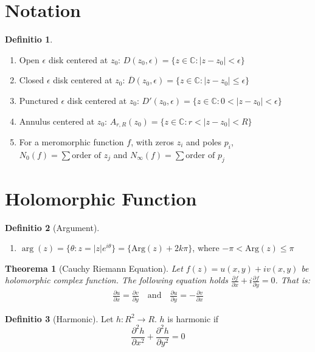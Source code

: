 \documentclass[12pt, a4paper]{article}
\newtheorem{theorem}{Theorema}[section]
\theoremstyle{definition}
\newtheorem{definition}{Definitio}[section]
\theoremstyle{remark}
\newcommand{\bb}[1]{\mathbb{#1}}
\newcommand{\Arg}{\text{Arg}}
\begin{document}
\section{Notation} 
\begin{definition}
	\ 
	\begin{enumerate}
		\item Open $\epsilon$ disk centered at $z_0$: $D(z_0, \epsilon) = \{z \in \bb{C} : |z - z_0| < \epsilon\}$
		\item Closed $\epsilon$ disk centered at $z_0$: $\overline{D}(z_0, \epsilon) = \{z \in \bb{C} : |z - z_0| \leq \epsilon\}$	
		\item Punctured $\epsilon$ disk centered at $z_0$: $D'(z_0, \epsilon) = \{z \in \bb{C} : 0 < |z - z_0| < \epsilon\}$
		\item Annulus centered at $z_0$: $A_{r, R}(z_0) = \{z \in \bb{C} : r < |z - z_0| < R\}$
    \item For a meromorphic function $f$, with zeros $z_i$ and poles $p_i$, $N_0(f) = \sum \text{order of } z_j$ and $N_{\infty} (f) = \sum \text{order of } p_j$
	\end{enumerate}

\end{definition}

\section{Holomorphic Function}

\begin{definition}[Argument]
	\ 
	\begin{enumerate}
		\item $\arg (z) = \{\theta : z = |z| e^{i \theta}\} = \{\Arg(z) + 2k\pi\}$, where $- \pi <\Arg(z) \leq \pi$
	\end{enumerate}
\end{definition}

\begin{theorem}[Cauchy Riemann Equation]
	Let $f(z) = u(x, y) + iv(x, y)$ be holomorphic 
	complex function. The following equation holds $\frac{\partial f}{\partial x} + i\frac{\partial f}{\partial y} =0 $. That is:
	\begin{align*}
		\frac{\partial u}{\partial x} = \frac{\partial v}{\partial y} \quad \text{and} \quad \frac{\partial u}{\partial y} = -\frac{\partial v}{\partial x}
	\end{align*}
\end{theorem}

\begin{definition}[Harmonic]
	Let $h: R^2 \rightarrow  R$. $h$ is harmonic if 
	$$
	\frac{\partial^2 h}{\partial x^2} + \frac{\partial^2 h}{\partial y^2} = 0
	$$
\end{definition}
\end{document}
